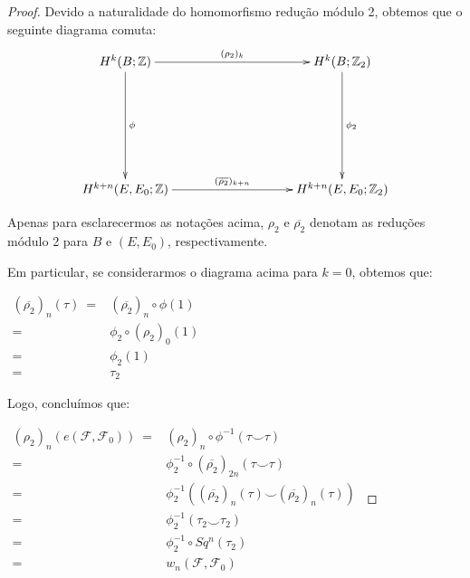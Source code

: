 \documentclass[12pt,oneside]{book} %
\newcommand{\Z}{\mathbb{Z}}
\newcommand{\ccup}{\smile}
\begin{document}
\begin{proof}
	\par Devido a naturalidade do homomorfismo redução módulo 2, obtemos que o seguinte diagrama comuta:
	$$ \xymatrix @C=0.5cm {
		H^{k}(B;\Z) \ar[rrrrr]^-{(\rho_{2})_{k}} \ar[ddd]^-{\phi} &&&&& H^{k}(B;\Z_{2}) \ar[ddd]^-{\phi_{2}} \\
		&&&&& \\		 
		&&&&& \\		 
		H^{k+n}(E,E_{0};\Z) \ar[rrrrr]^-{(\overline{\rho_{2}})_{k+n}} &&&&& H^{k+n}(E,E_{0};\Z_{2})
	} $$
	
	\par Apenas para esclarecermos as notações acima, $\rho_{2}$ e $\overline{\rho_{2}}$ denotam as reduções módulo 2 para $B$ e $(E,E_{0})$, respectivamente.
	
	\par Em particular, se considerarmos o diagrama acima para $k=0$, obtemos que: \newline
	
	$ \begin{array}{rl}
		(\overline{\rho_{2}})_{n}(\tau) \ = & (\overline{\rho_{2}})_{n}\circ\phi(1) \\
		= & \phi_{2}\circ (\rho_{2})_{0}(1) \\
		= & \phi_{2}(1) \\
		= & \tau_{2}
	\end{array} $ \newline
	
	\par Logo, concluímos que: \newline
	
	$ \begin{array}{rl}
		(\rho_{2})_{n}(e(\mathcal{F},\mathcal{F}_{0})) \ = & (\rho_{2})_{n}\circ \phi^{-1}(\tau\ccup \tau) \\
		= & \phi_{2}^{-1}\circ (\overline{\rho_{2}})_{2n}(\tau\ccup \tau) \\
		= & \phi_{2}^{-1}((\overline{\rho_{2}})_{n}(\tau)\ccup (\overline{\rho_{2}})_{n}(\tau)) \\
		= & \phi_{2}^{-1}(\tau_{2}\ccup \tau_{2}) \\
		= & \phi_{2}^{-1}\circ Sq^{n}(\tau_{2}) \\
		= & w_{n}(\mathcal{F},\mathcal{F}_{0})
	\end{array} $
	
\end{proof}
\end{document}
